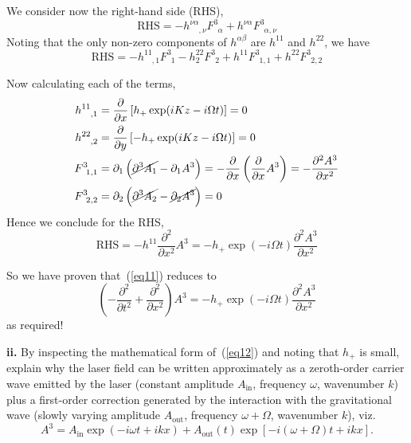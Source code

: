 \documentclass[a4paper]{article} %
\newcommand{\ph}[1]{\phantom{#1}}
\begin{document}
We consider now the right-hand side (RHS),
\begin{equation}
\text{RHS}=-h^{\nu\alpha}_{\ph{\nu\alpha},\nu}F^{3}_{\ph{3}\alpha}
+h^{\nu\alpha}F^{3}_{\ph{3}\alpha,\nu}
\end{equation}
Noting that the only non-zero components of $h^{\alpha\beta}$ are $h^{11}$ and $h^{22}$, we have
\begin{equation}
\text{RHS}=-h^{11}_{\ph{11},1}F^{3}_{\ph{3}1}-h^{22}_{2}F^3_{\ph{3}2}+h^{11}F^{3}_{\ph{3}1,1}
+h^{22}F^{3}_{\ph{3}2,2}
\end{equation}

Now calculating each of the terms,
\begin{align}
h^{11}_{\ph{11},1}&=\frac{\partial}{\partial x}\left[h_+\exp(iKz-i\Omega t)\right]=0\\
h^{22}_{\ph{22},2}&=\frac{\partial}{\partial y}\left[-h_+\exp(iKz - i\Omega t)\right]=0\\
F^{3}_{\ph{3}1,1}&=\partial_{1}\left(\cancel{\partial^3 A_1} - \partial_1 A^3\right)
=-\frac{\partial}{\partial x}\left(\frac{\partial}{\partial x}A^3\right)=-\frac{\partial^2 A^3}{\partial x^2}\\
F^{3}_{\ph{3}2,2}&=\partial_{2}\left(\cancel{\partial^3 A_2} - \cancel{\partial_2 A^3}\right)=0
\end{align}
Hence we conclude for the RHS,
\begin{equation}
\text{RHS}=-h^{11}\frac{\partial^2}{\partial x^2}A^3 = -h_+\exp(-i\Omega t) \frac{\partial^2 A^3}{\partial x^2}
\end{equation}

So we have proven that~(\ref{eq11}) reduces to
\begin{equation}
\left(-\frac{\partial^2}{\partial t^2}+\frac{\partial^2}{\partial x^2}\right)A^3 = -h_+ \exp(-i\Omega t) \frac{\partial^2 A^3}{\partial x^2}\label{a3 de}
\end{equation}
as required!

\begin{framed}
\textbf{ii.} By inspecting the mathematical form of~(\ref{eq12}) and noting that $h_+$ is small, explain why the laser field can be written approximately as a zeroth-order carrier wave emitted by the laser (constant amplitude $A_{\text{in}}$, frequency $\omega$, wavenumber $k$) plus a first-order correction generated by the interaction with the gravitational wave (slowly varying amplitude $A_{\text{out}}$, frequency $\omega+\Omega$, wavenumber $k$), viz.
\begin{equation}
A^3 = A_{\text{in}}\exp(-i\omega t + ikx) + A_{\text{out}}(t)\exp[-i(\omega + \Omega)t + ikx]. \label{eq13}
\end{equation}
\end{framed}
\end{document}
